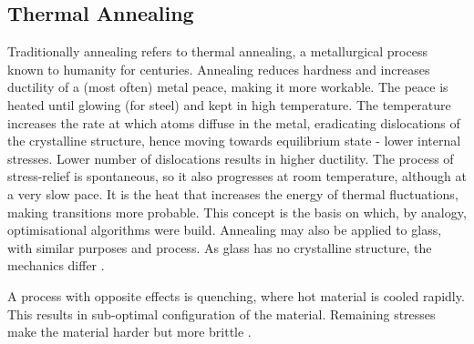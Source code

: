\subsection{Thermal Annealing} \label{sub:thermal_annealing}
Traditionally annealing refers to thermal annealing, a metallurgical process known to humanity for centuries. Annealing reduces hardness and increases ductility of a (most often) metal peace, making it more workable. The peace is heated until glowing (for steel) and kept in high temperature. The temperature increases the rate at which atoms diffuse in the metal, eradicating dislocations of the crystalline structure, hence moving towards equilibrium state - lower internal stresses. Lower number of dislocations results in higher ductility. The process of stress-relief is spontaneous, so it also progresses at room temperature, although at a very slow pace. It is the heat that increases the energy of thermal fluctuations, making transitions more probable. This concept is the basis on which, by analogy, optimisational algorithms were build. Annealing may also be applied to glass, with similar purposes and process. As glass has no crystalline structure, the mechanics differ \cite{wikipedia_contributors_annealing_2021}.

A process with opposite effects is quenching, where hot material is cooled rapidly. This results in sub-optimal configuration of the material. Remaining stresses make the material harder but more brittle \cite{wikipedia_contributors_quenching_2021}.
